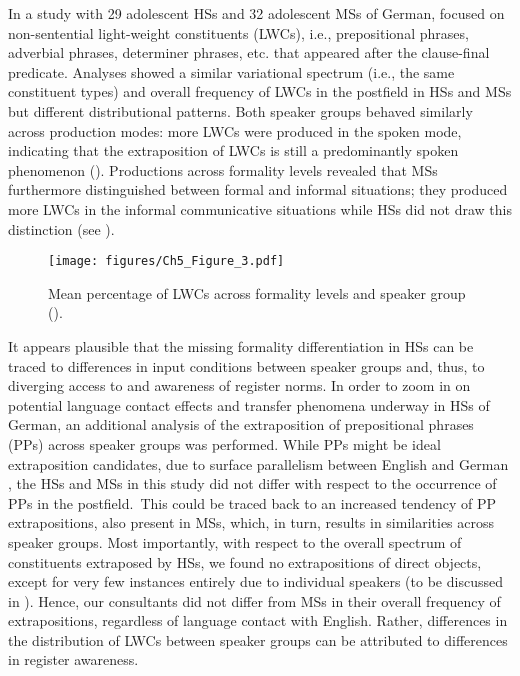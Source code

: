 \documentclass[output=paper]{langscibook}
\begin{document}
In a study with 29 adolescent HSs and 32 adolescent MSs of German, \citet{Tsehaye2023} focused on non-sentential light-weight constituents (LWCs), i.e., prepositional phrases, adverbial phrases, determiner phrases, etc. that appeared after the clause-final predicate. Analyses showed a similar variational spectrum (i.e., the same constituent types) and overall frequency of LWCs in the postfield in HSs and MSs but different distributional patterns. Both speaker groups behaved similarly across production modes: more LWCs were produced in the spoken mode, indicating that the extraposition of LWCs is still a predominantly spoken phenomenon (\citealt{Imo2015, Zifonun2015, ZifonunHoffmannStrecker1997}). Productions across formality levels revealed that MSs furthermore distinguished between formal and informal situations; they produced more LWCs in the informal communicative situations while HSs did not draw this distinction (see ).

\begin{figure}
\texttt{[image: figures/Ch5\_Figure\_3.pdf]}
\caption{Mean percentage of LWCs across formality levels and speaker group (\citealt[9]{Tsehaye2023}).}
\label{fig:tsehaye:5}
\end{figure}

It appears plausible that the missing formality differentiation in HSs can be traced to differences in input conditions between speaker groups and, thus, to diverging access to and awareness of register norms. In order to zoom in on potential language contact effects and transfer phenomena underway in HSs of German, an additional analysis of the extraposition of prepositional phrases (PPs) across speaker groups was performed. While PPs might be ideal extraposition candidates, due to surface parallelism between English and German \citep{HoppPutnam2015, WestphalFitch2011}, the HSs and MSs in this study did not differ with respect to the occurrence of PPs in the postfield.~This could be traced back to an increased tendency of PP extrapositions, also present in MSs, which, in turn, results in similarities across speaker groups. Most importantly, with respect to the overall spectrum of constituents extraposed by HSs, we found no extrapositions of direct objects, except for very few instances entirely due to individual speakers (to be discussed in ). Hence, our consultants did not differ from MSs in their overall frequency of extrapositions, regardless of language contact with English. Rather, differences in the distribution of LWCs between speaker groups can be attributed to differences in register awareness.
\end{document}
